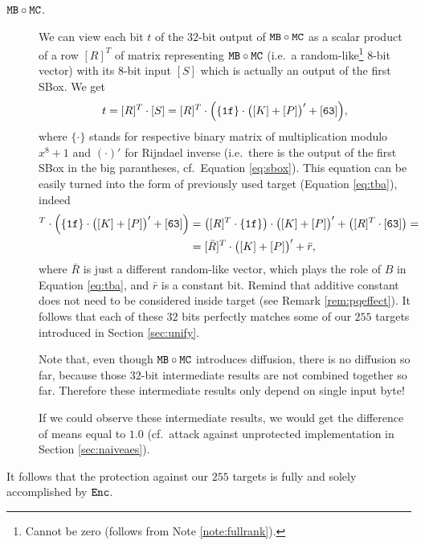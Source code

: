 \begin{description}
	\item[$\texttt{MB}\circ\texttt{MC}$.] We can view each bit $t$ of the $32$-bit output of $\texttt{MB}\circ\texttt{MC}$ as a scalar product of a row $[R]^T$ of matrix representing $\texttt{MB}\circ\texttt{MC}$ (i.e.\ a random-like\footnote{Cannot be zero (follows from Note \ref{note:fullrank}).} $8$-bit vector) with its $8$-bit input $[S]$ which is actually an output of the first SBox. We get
	\begin{equation}
		t = [R]^T\cdot [S] = [R]^T\cdot\Bigl( \{\texttt{1f}\}\cdot\bigl([K]+[P]\bigr)' + [\texttt{63}] \Bigr) ,
	\end{equation}
	where $\{\cdot\}$ stands for respective binary matrix of multiplication modulo $x^8+1$ and $(\cdot)'$ for Rijndael inverse (i.e.\ there is the output of the first SBox in the big parantheses, cf.\ Equation \ref{eq:sbox}). This equation can be easily turned into the form of previously used target (Equation \ref{eq:tba}), indeed
	\begin{align*}
		[R]^T\cdot\Bigl( \{\texttt{1f}\}\cdot\bigl([K]+[P]\bigr)' + [\texttt{63}] \Bigr) &= \bigl([R]^T\cdot \{\texttt{1f}\}\bigr)\cdot\bigl([K]+[P]\bigr)' + \bigl([R]^T\cdot [\texttt{63}]\bigr) = \\
		&= [\bar R]^T \cdot \bigl([K]+[P]\bigr)' + \bar r ,
	\end{align*}
	where $\bar R$ is just a different random-like vector, which plays the role of $B$ in Equation \ref{eq:tba}, and $\bar r$ is a constant bit. Remind that additive constant does not need to be considered inside target (see Remark \ref{rem:pqeffect}). It follows that each of these $32$ bits perfectly matches some of our $255$ targets introduced in Section \ref{sec:unify}.
	
	Note that, even though $\texttt{MB}\circ\texttt{MC}$ introduces diffusion, there is no diffusion so far, because those $32$-bit intermediate results are not combined together so far. Therefore these intermediate results only depend on single input byte!
	
	If we could observe these intermediate results, we would get the difference of means equal to $1.0$ (cf.\ attack against unprotected implementation in Section \ref{sec:naiveaes}).
\end{description}
\begin{remark}
\label{rem:enc}
	It follows that the protection against our $255$ targets is fully and solely accomplished by $\texttt{Enc}$.
\end{remark}
